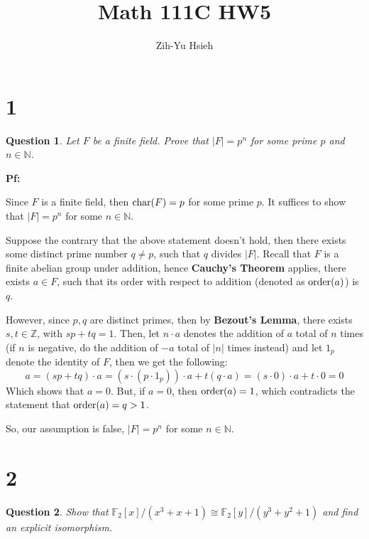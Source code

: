 \documentclass{article}
\title{Math 111C HW5}
\author{Zih-Yu Hsieh}
\newtheorem{question}{Question}
\begin{document}
\maketitle

\section*{1}
\begin{myBox}[]{}
    \begin{question}
        Let $F$ be a finite field. Prove that $|F|=p^n$ for some prime $p$ and $n\in\mathbb{N}$.
    \end{question}
\end{myBox}

\textbf{Pf:}

Since $F$ is a finite field, then $\textmd{char}(F)=p$ for some prime $p$. It suffices to show that $|F|=p^n$ for some $n\in\mathbb{N}$.

Suppose the contrary that the above statement doesn't hold, then there exists some distinct prime number $q\neq p$, such that $q$ divides $|F|$. Recall that $F$ is a finite abelian group under addition, hence \textbf{Cauchy's Theorem} applies, there exists $a\in F$, such that its order with respect to addition (denoted as $\textmd{order}(a)$) is $q$.

However, since $p,q$ are distinct primes, then by \textbf{Bezout's Lemma}, there exists $s,t\in\mathbb{Z}$, with $sp+tq = 1$. Then, let $n\cdot a$ denotes the addition of $a$ total of $n$ times (if $n$ is negative, do the addition of $-a$ total of $|n|$ times instead) and let $1_p$ denote the identity of $F$, then we get the following:
$$a = (sp+tq)\cdot a = (s\cdot (p\cdot 1_p))\cdot a + t(q\cdot a) = (s\cdot 0)\cdot a + t\cdot 0 = 0$$
Which shows that $a=0$. But, if $a=0$, then $\textmd{order}(a)=1$, which contradicts the statement that $\textmd{order}(a)=q>1$. 

So, our assumption is false, $|F|=p^n$ for some $n\in\mathbb{N}$.

\hfil

\hfil

\section*{2}
\begin{myBox}[]{}
    \begin{question}
        Show that $\mathbb{F}_2[x]/(x^3+x+1)\cong \mathbb{F}_2[y]/(y^3+y^2+1)$ and find an explicit isomorphism.
    \end{question}
\end{myBox}
\end{document}
